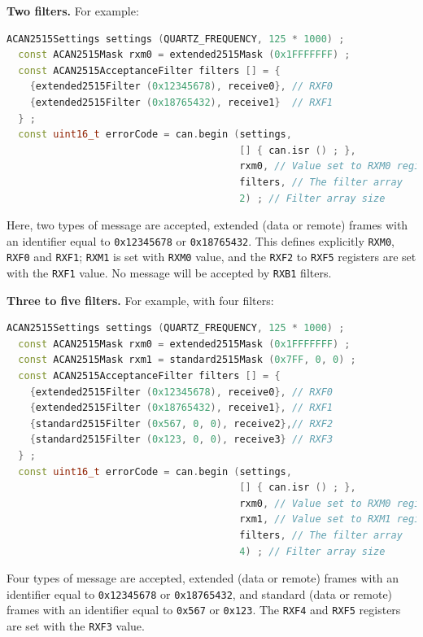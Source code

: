 \documentclass[10pt, a4paper, obeyspaces]{extarticle}
\begin{document}
{\bf Two filters.} For example:
{ \small\begin{lstlisting}[language=c++]
  ACAN2515Settings settings (QUARTZ_FREQUENCY, 125 * 1000) ;
  const ACAN2515Mask rxm0 = extended2515Mask (0x1FFFFFFF) ;
  const ACAN2515AcceptanceFilter filters [] = {
    {extended2515Filter (0x12345678), receive0}, // RXF0
    {extended2515Filter (0x18765432), receive1}  // RXF1
  } ;
  const uint16_t errorCode = can.begin (settings,
                                        [] { can.isr () ; },
                                        rxm0, // Value set to RXM0 register
                                        filters, // The filter array
                                        2) ; // Filter array size
\end{lstlisting}}

Here, two types of message are accepted, extended (data or remote) frames with an identifier equal to \texttt{0x12345678} or \texttt{0x18765432}. This defines explicitly \texttt{RXM0}, \texttt{RXF0} and \texttt{RXF1}; \texttt{RXM1} is set with \texttt{RXM0} value, and the \texttt{RXF2} to \texttt{RXF5} registers are set with the \texttt{RXF1} value. No message will be accepted by \texttt{RXB1} filters.










{\bf Three to five filters.} For example, with four filters:
{ \small\begin{lstlisting}[language=c++]
  ACAN2515Settings settings (QUARTZ_FREQUENCY, 125 * 1000) ;
  const ACAN2515Mask rxm0 = extended2515Mask (0x1FFFFFFF) ;
  const ACAN2515Mask rxm1 = standard2515Mask (0x7FF, 0, 0) ;
  const ACAN2515AcceptanceFilter filters [] = {
    {extended2515Filter (0x12345678), receive0}, // RXF0
    {extended2515Filter (0x18765432), receive1}, // RXF1
    {standard2515Filter (0x567, 0, 0), receive2},// RXF2
    {standard2515Filter (0x123, 0, 0), receive3} // RXF3
  } ;
  const uint16_t errorCode = can.begin (settings,
                                        [] { can.isr () ; },
                                        rxm0, // Value set to RXM0 register
                                        rxm1, // Value set to RXM1 register
                                        filters, // The filter array
                                        4) ; // Filter array size
\end{lstlisting}}

Four types of message are accepted, extended (data or remote) frames with an identifier equal to \texttt{0x12345678} or \texttt{0x18765432}, and standard (data or remote) frames with an identifier equal to \texttt{0x567} or \texttt{0x123}. The \texttt{RXF4} and \texttt{RXF5} registers are set with the \texttt{RXF3} value.
\end{document}
